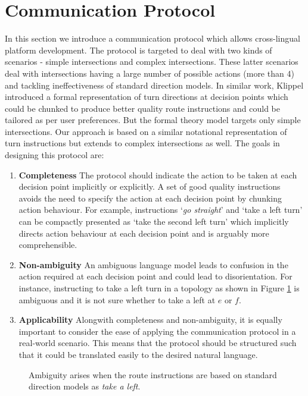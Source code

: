\documentclass{iitkthesis}
\begin{document}
  \section{Communication Protocol}
In this section we introduce a communication protocol which allows
cross-lingual platform development. The protocol is targeted to deal with 
two kinds of scenarios - simple intersections and complex intersections. 
These latter scenarios deal with intersections having a 
large number of possible actions (more than 4) and tackling 
ineffectiveness of standard direction models. In similar 
work, Klippel \cite{klippel} introduced a formal representation of turn 
directions at decision points which could be chunked to produce better 
quality route instructions and could be tailored as per user preferences. 
But the formal theory model targets only simple intersections. Our 
approach is based on a similar notational representation of turn 
instructions but extends to complex intersections as well. The goals in 
designing this protocol are: 
\begin{enumerate}
\item \textbf{Completeness}
The protocol should indicate the action to be taken at each decision 
point implicitly or explicitly. A set of good quality instructions avoids 
the need to specify the action at each decision point by chunking action 
behaviour. For example, instructions `\textit{go straight}' and 
‘take a left turn’ can be compactly presented as ‘take the second left 
turn’ which implicitly directs action behaviour at each decision point 
and is arguably more comprehensible. 
\item \textbf{Non-ambiguity}
An ambiguous language model leads to confusion in the action required at each 
decision point and could lead to disorientation. For instance, 
instructing to take a left turn in a topology as shown in Figure 
\ref{fig:turnA} is ambiguous and it is not sure whether to take a left at 
$e$ or $f$.
\item \textbf{Applicability}
Alongwith completeness and non-ambiguity, it is equally important to 
consider the ease of applying the communication protocol in a real-world 
scenario. This means that the protocol should be structured such that it 
could be translated easily to the desired natural language.
\end{enumerate}
 \begin{figure}
\centering
\caption{Ambiguity arises when the route instructions are based on 
standard direction models as \textit{take a left}.}
\label{fig:turnA}
 \end{figure}
\end{document}
